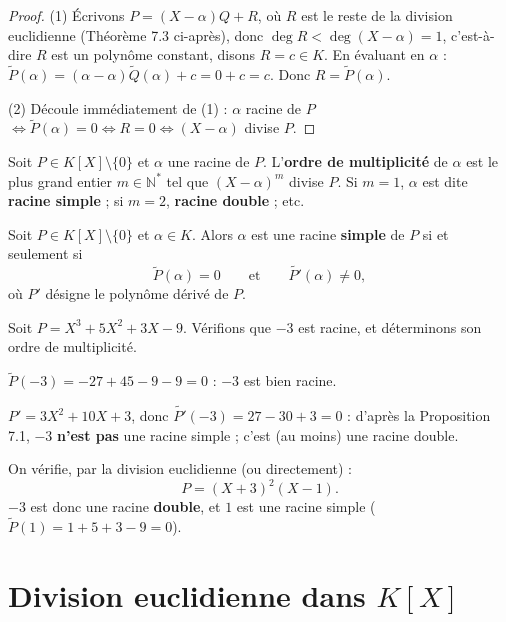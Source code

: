\documentclass[a4paper,12pt,openany]{book}
\begin{document}
\begin{proof}
(1) Écrivons $P=(X-\alpha)Q+R$, où $R$ est le reste de la division
euclidienne (Théorème 7.3 ci-après), donc $\deg R < \deg(X-\alpha)=1$,
c'est-à-dire $R$ est un polynôme constant, disons $R=c\in K$. En évaluant
en $\alpha$ : $\widetilde P(\alpha) = (\alpha-\alpha)\widetilde
Q(\alpha)+c = 0+c = c$. Donc $R = \widetilde P(\alpha)$.

(2) Découle immédiatement de (1) : $\alpha$ racine de $P$
$\iff \widetilde P(\alpha)=0 \iff R=0 \iff (X-\alpha)$ divise $P$.
\end{proof}

\begin{definition}
Soit $P\in K[X]\setminus\{0\}$ et $\alpha$ une racine de $P$. L'\textbf{ordre
de multiplicité} de $\alpha$ est le plus grand entier $m\in\mathbb{N}^*$
tel que $(X-\alpha)^m$ divise $P$. Si $m=1$, $\alpha$ est dite
\textbf{racine simple} ; si $m=2$, \textbf{racine double} ; etc.
\end{definition}

\begin{proposition}
Soit $P\in K[X]\setminus\{0\}$ et $\alpha\in K$. Alors $\alpha$ est une
racine \textbf{simple} de $P$ si et seulement si
\[
\widetilde P(\alpha) = 0 \qquad \text{et} \qquad \widetilde{P'}(\alpha)
\neq 0,
\]
où $P'$ désigne le polynôme dérivé de $P$.
\end{proposition}

\begin{exemple}[7.1]
Soit $P = X^3+5X^2+3X-9$. Vérifions que $-3$ est racine, et déterminons
son ordre de multiplicité.

$\widetilde P(-3) = -27+45-9-9 = 0$ : $-3$ est bien racine.

$P' = 3X^2+10X+3$, donc $\widetilde{P'}(-3) = 27-30+3=0$ : d'après la
Proposition 7.1, $-3$ \textbf{n'est pas} une racine simple ; c'est (au
moins) une racine double.

On vérifie, par la division euclidienne (ou directement) :
\[
P = (X+3)^2(X-1).
\]
$-3$ est donc une racine \textbf{double}, et $1$ est une racine simple
($\widetilde P(1) = 1+5+3-9=0$).
\end{exemple}

\section{Division euclidienne dans \texorpdfstring{$K[X]$}{K[X]}}
\end{document}

